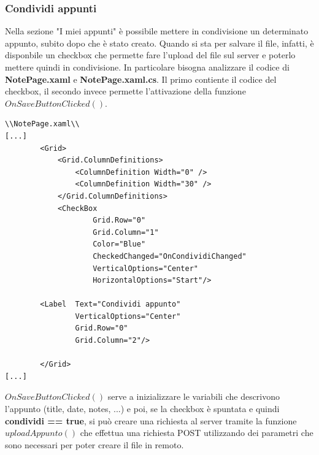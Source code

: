 \documentclass[a4paper, 50pt, twoside]{article}
\begin{document}
\subsubsection{Condividi appunti}
Nella sezione "I miei appunti" è possibile mettere in condivisione un determinato appunto, subito dopo che è stato creato. Quando si sta per salvare il file, infatti, è disponbile un checkbox che permette fare l'upload del file sul server e poterlo mettere quindi in condivisione. In particolare bisogna analizzare il codice di \textbf{NotePage.xaml} e \textbf{NotePage.xaml.cs}. Il primo contiente il codice del checkbox, il secondo invece permette l'attivazione della funzione $OnSaveButtonClicked()$.
\begin{lstlisting}
\\NotePage.xaml\\
[...]
        <Grid>
            <Grid.ColumnDefinitions>
                <ColumnDefinition Width="0" />
                <ColumnDefinition Width="30" />
            </Grid.ColumnDefinitions>
            <CheckBox   
                    Grid.Row="0"
                    Grid.Column="1"
                    Color="Blue"
                    CheckedChanged="OnCondividiChanged"
                    VerticalOptions="Center" 
                    HorizontalOptions="Start"/>
            
        <Label  Text="Condividi appunto"
                VerticalOptions="Center" 
                Grid.Row="0"
                Grid.Column="2"/>
      
        </Grid>
[...]
\end{lstlisting}
$OnSaveButtonClicked()$ serve a inizializzare le variabili che descrivono l'appunto (title, date, notes, ...) e poi, se la checkbox è spuntata e quindi \textbf{condividi == true}, si può creare una richiesta al server tramite la funzione $uploadAppunto()$ che effettua una richiesta POST utilizzando dei parametri che sono necessari per poter creare il file in remoto.
\end{document}
